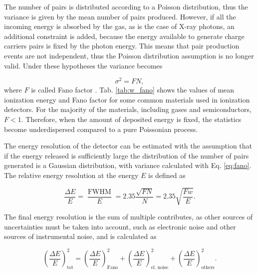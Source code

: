 The number of pairs is distributed according to a Poisson distribution, thus the variance is given by the mean number of pairs produced. However, if all the incoming energy is absorbed by the gas, as is the case of X-ray photons, an additional constraint is added, because the energy available to generate charge carriers pairs is fixed by the photon energy. This means that pair production events are not independent, thus the Poisson distribution assumption is no longer valid. Under these hypotheses the variance becomes

\begin{equation}
\sigma^2 = F N,
\label{eq:fano}
\end{equation}
where $F$ is called Fano factor \cite{leo1994}. Tab. \ref{tab:w_fano} shows the values of mean ionization energy and Fano factor for some common materials used in ionization detectors. For the majority of the materials, including gases and semiconductors, $F < 1$. Therefore, when the amount of deposited energy is fixed, the statistics become underdispersed compared to a pure Poissonian process.

The energy resolution of the detector can be estimated with the assumption that if the energy released is sufficiently large the distribution of the number of pairs generated is a Gaussian distribution, with variance calculated with Eq. \ref{eq:fano}. The relative energy resolution at the energy $E$ is defined as
 
\begin{equation}
\frac{\Delta E}{E} = \frac{\operatorname{FWHM}}{E} = 2.35 \frac{\sqrt{F N}}{N} = 2.35 \sqrt{\frac{F w}{E}}.
\label{eq:e_resolution}
\end{equation}

The final energy resolution is the sum of multiple contributes, as other sources of uncertainties must be taken into account, such as electronic noise and other sources of instrumental noise, and is calculated as

\begin{equation}
\left( \frac{\Delta E}{E} \right)_{\textrm{tot}}^2 = \left( \frac{\Delta E}{E} \right)_{\textrm{Fano}}^2 + \left( \frac{\Delta E}{E} \right)_{\textrm{el. noise}}^2 + \left( \frac{\Delta E}{E} \right)_{\textrm{others}}^2.
\end{equation}

